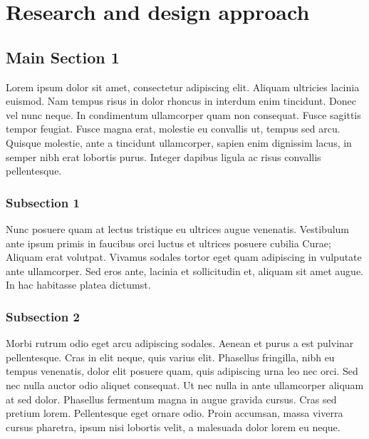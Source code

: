 
\chapter{Research and design approach} %

\label{Chapter3} %


\section{Main Section 1}

Lorem ipsum dolor sit amet, consectetur adipiscing elit. Aliquam ultricies lacinia
euismod. Nam tempus risus in dolor rhoncus in interdum enim tincidunt. Donec vel nunc
neque. In condimentum ullamcorper quam non consequat. Fusce sagittis tempor feugiat. Fusce
magna erat, molestie eu convallis ut, tempus sed arcu. Quisque molestie, ante a tincidunt
ullamcorper, sapien enim dignissim lacus, in semper nibh erat lobortis purus. Integer
dapibus ligula ac risus convallis pellentesque.

\subsection{Subsection 1}

Nunc posuere quam at lectus tristique eu ultrices augue venenatis. Vestibulum ante ipsum
primis in faucibus orci luctus et ultrices posuere cubilia Curae; Aliquam erat volutpat.
Vivamus sodales tortor eget quam adipiscing in vulputate ante ullamcorper. Sed eros ante,
lacinia et sollicitudin et, aliquam sit amet augue. In hac habitasse platea dictumst.


\subsection{Subsection 2}
Morbi rutrum odio eget arcu adipiscing sodales. Aenean et purus a est pulvinar
pellentesque. Cras in elit neque, quis varius elit. Phasellus fringilla, nibh eu tempus
venenatis, dolor elit posuere quam, quis adipiscing urna leo nec orci. Sed nec nulla
auctor odio aliquet consequat. Ut nec nulla in ante ullamcorper aliquam at sed dolor.
Phasellus fermentum magna in augue gravida cursus. Cras sed pretium lorem. Pellentesque
eget ornare odio. Proin accumsan, massa viverra cursus pharetra, ipsum nisi lobortis
velit, a malesuada dolor lorem eu neque.

